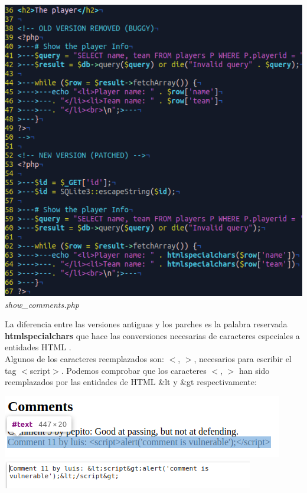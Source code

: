 \documentclass[10pt,a4paper]{article}
\begin{document}
\begin{enumerate}
\begin{center}
\includegraphics[scale=0.6]{show_comments.png}\\
\textit{show\_comments.php}
\end{center}

La diferencia entre las versiones antiguas y los parches es la palabra reservada \textbf{htmlspecialchars} que hace las conversiones necesarias de caracteres especiales a entidades HTML \cite{php}.\\
Algunos de los caracteres reemplazados son: $<$, $>$, necesarios para escribir el tag $<$script$>$.
Podemos comprobar que los caracteres $<$, $>$ han sido reemplazados por las entidades de HTML \&lt y \&gt respectivamente:
\begin{center}
\includegraphics[scale=0.6]{inspect.png}
\includegraphics[scale=0.6]{entities.png}
\end{center}


\end{enumerate}
\end{document}
